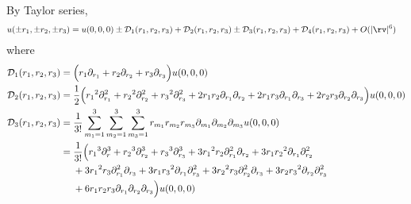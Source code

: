 By Taylor series,
\begin{align}
  u(\pm\ra,\pm\rb,\pm\rc)&= u(0,0,0) \pm \Ds_1(\ra,\rb,\rc) + \Ds_2(\ra,\rb,\rc) 
                            \pm \Ds_3(\ra,\rb,\rc) + \Ds_4(\ra,\rb,\rc) + \trunc \label{eq:taylor3d}
\end{align}
where
\begin{align*}
  {\cal D}_1({r_1},{r_2},{r_3}) &= \Big({r_1} \partial_{r_1} + {r_2} \partial_{r_2} + {r_3}\partial_{r_3} \Big) u(0,0,0) \\
  {\cal D}_2({r_1},{r_2},{r_3}) &= {1\over2}\Big( {r_1}^2\partial_{r_1}^2+ {r_2}^2\partial_{r_2}^2+ {r_3}^2\partial_{r_3}^2
      +2{r_1} {r_2}\partial_{r_1}\partial_{r_2} + 2{r_1} {r_3}\partial_{r_1}\partial_{r_3} +2{r_2} {r_3}\partial_{r_2}\partial_{r_3} 
                       \Big)u(0,0,0)  \\
  {\cal D}_3({r_1},{r_2},{r_3}) &= {1\over3!}\sum_{m_1=1}^3\sum_{m_2=1}^3\sum_{m_3=1}^3
                         r_{m_1} r_{m_2} r_{m_3} \partial_{m_1}\partial_{m_2}\partial_{m_3} u(0,0,0) \\
                     &={1\over3!}\Big( {r_1}^3\partial_r^3+ {r_2}^3\partial_{r_2}^3+ {r_3}^3\partial_{r_3}^3
   +3 {r_1}^2 {r_2}\partial_{r_1}^2\partial_{r_2} + 3 {r_1}{r_2}^2\partial_{r_1}\partial_{r_2}^2  \\
  &~~~~ +3 {r_1}^2 {r_3}\partial_{r_1}^2\partial_{r_3} + 3 {r_1}{r_3}^2\partial_{r_1}\partial_{r_3}^2 
   +3 {r_2}^2 {r_3}\partial_{r_2}^2\partial_{r_3}+ 3 {r_2}{r_3}^2\partial_{r_2}\partial_{r_3}^2 \\
  &~~~~ +6 {r_1}{r_2}{r_3} \partial_{r_1}\partial_{r_2}\partial_{r_3}  \Big) u(0,0,0)  
\end{align*}


